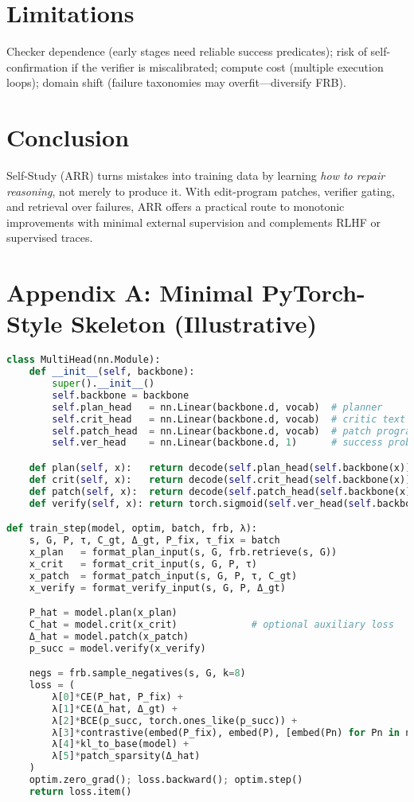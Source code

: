 \documentclass[11pt]{article}
\begin{document}
\section{Limitations}
Checker dependence (early stages need reliable success predicates); risk of self-confirmation if the verifier is miscalibrated; compute cost (multiple execution loops); domain shift (failure taxonomies may overfit---diversify FRB).

\section{Conclusion}
Self-Study (ARR) turns mistakes into training data by learning \emph{how to repair reasoning}, not merely to produce it. With edit-program patches, verifier gating, and retrieval over failures, ARR offers a practical route to monotonic improvements with minimal external supervision and complements RLHF or supervised traces.

\appendix
\section{Appendix A: Minimal PyTorch-Style Skeleton (Illustrative)}
\begin{lstlisting}[language=Python, caption={Minimal multi-head scaffold and training step.}]
class MultiHead(nn.Module):
    def __init__(self, backbone):
        super().__init__()
        self.backbone = backbone
        self.plan_head   = nn.Linear(backbone.d, vocab)  # planner
        self.crit_head   = nn.Linear(backbone.d, vocab)  # critic text
        self.patch_head  = nn.Linear(backbone.d, vocab)  # patch program
        self.ver_head    = nn.Linear(backbone.d, 1)      # success prob

    def plan(self, x):   return decode(self.plan_head(self.backbone(x)))
    def crit(self, x):   return decode(self.crit_head(self.backbone(x)))
    def patch(self, x):  return decode(self.patch_head(self.backbone(x)))
    def verify(self, x): return torch.sigmoid(self.ver_head(self.backbone(x))).squeeze(-1)

def train_step(model, optim, batch, frb, λ):
    s, G, P, τ, C_gt, Δ_gt, P_fix, τ_fix = batch
    x_plan   = format_plan_input(s, G, frb.retrieve(s, G))
    x_crit   = format_crit_input(s, G, P, τ)
    x_patch  = format_patch_input(s, G, P, τ, C_gt)
    x_verify = format_verify_input(s, G, P, Δ_gt)

    P_hat = model.plan(x_plan)
    C_hat = model.crit(x_crit)             # optional auxiliary loss
    Δ_hat = model.patch(x_patch)
    p_succ = model.verify(x_verify)

    negs = frb.sample_negatives(s, G, k=8)
    loss = (
        λ[0]*CE(P_hat, P_fix) +
        λ[1]*CE(Δ_hat, Δ_gt) +
        λ[2]*BCE(p_succ, torch.ones_like(p_succ)) +
        λ[3]*contrastive(embed(P_fix), embed(P), [embed(Pn) for Pn in negs]) +
        λ[4]*kl_to_base(model) +
        λ[5]*patch_sparsity(Δ_hat)
    )
    optim.zero_grad(); loss.backward(); optim.step()
    return loss.item()
\end{lstlisting}
\end{document}
